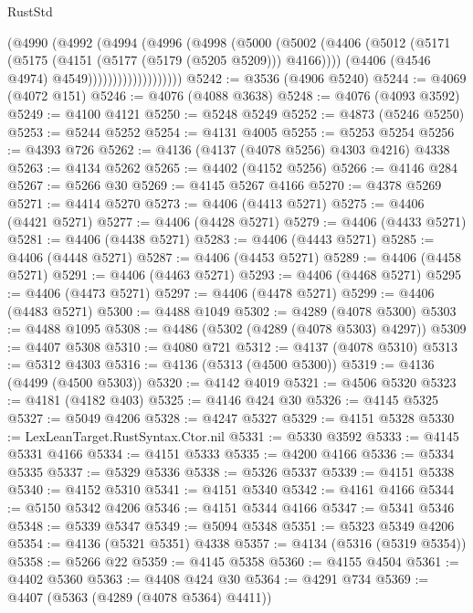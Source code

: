\begin{lexlean}{RustStd}
\begin{coremodule}
                        (@4990
                          (@4992
                            (@4994
                              (@4996
                                (@4998
                                  (@5000
                                    (@5002
                                      (@4406
                                        (@5012
                                          (@5171
                                            (@5175 (@4151 (@5177 (@5179 (@5205 @5209))) @4166))))
                                        (@4406 (@4546 @4974) @4549)))))))))))))))))))
@5242 := @3536 (@4906 @5240)
@5244 := @4069 (@4072 @151)
@5246 := @4076 (@4088 @3638)
@5248 := @4076 (@4093 @3592)
@5249 := @4100 @4121
@5250 := @5248 @5249
@5252 := @4873 (@5246 @5250)
@5253 := @5244 @5252
@5254 := @4131 @4005
@5255 := @5253 @5254
@5256 := @4393 @726
@5262 := @4136 (@4137 (@4078 @5256) @4303 @4216) @4338
@5263 := @4134 @5262
@5265 := @4402 (@4152 @5256)
@5266 := @4146 @284
@5267 := @5266 @30
@5269 := @4145 @5267 @4166
@5270 := @4378 @5269
@5271 := @4414 @5270
@5273 := @4406 (@4413 @5271)
@5275 := @4406 (@4421 @5271)
@5277 := @4406 (@4428 @5271)
@5279 := @4406 (@4433 @5271)
@5281 := @4406 (@4438 @5271)
@5283 := @4406 (@4443 @5271)
@5285 := @4406 (@4448 @5271)
@5287 := @4406 (@4453 @5271)
@5289 := @4406 (@4458 @5271)
@5291 := @4406 (@4463 @5271)
@5293 := @4406 (@4468 @5271)
@5295 := @4406 (@4473 @5271)
@5297 := @4406 (@4478 @5271)
@5299 := @4406 (@4483 @5271)
@5300 := @4488 @1049
@5302 := @4289 (@4078 @5300)
@5303 := @4488 @1095
@5308 := @4486 (@5302 (@4289 (@4078 @5303) @4297))
@5309 := @4407 @5308
@5310 := @4080 @721
@5312 := @4137 (@4078 @5310)
@5313 := @5312 @4303
@5316 := @4136 (@5313 (@4500 @5300))
@5319 := @4136 (@4499 (@4500 @5303))
@5320 := @4142 @4019
@5321 := @4506 @5320
@5323 := @4181 (@4182 @403)
@5325 := @4146 @424 @30
@5326 := @4145 @5325
@5327 := @5049 @4206
@5328 := @4247 @5327
@5329 := @4151 @5328
@5330 := LexLeanTarget.RustSyntax.Ctor.nil
@5331 := @5330 @3592
@5333 := @4145 @5331 @4166
@5334 := @4151 @5333
@5335 := @4200 @4166
@5336 := @5334 @5335
@5337 := @5329 @5336
@5338 := @5326 @5337
@5339 := @4151 @5338
@5340 := @4152 @5310
@5341 := @4151 @5340
@5342 := @4161 @4166
@5344 := @5150 @5342 @4206
@5346 := @4151 @5344 @4166
@5347 := @5341 @5346
@5348 := @5339 @5347
@5349 := @5094 @5348
@5351 := @5323 @5349 @4206
@5354 := @4136 (@5321 @5351) @4338
@5357 := @4134 (@5316 (@5319 @5354))
@5358 := @5266 @22
@5359 := @4145 @5358
@5360 := @4155 @4504
@5361 := @4402 @5360
@5363 := @4408 @424 @30
@5364 := @4291 @734
@5369 := @4407 (@5363 (@4289 (@4078 @5364) @4411))

\end{coremodule}
\end{lexlean}

